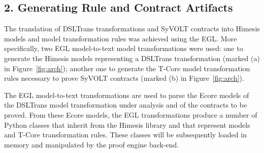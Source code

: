 \subsection*{2. Generating Rule and Contract Artifacts}
\label{sec:gen_models_mt}

The translation of DSLTrans transformations and SyVOLT contracts into Himesis
models and model transformation rules was achieved using the EGL. More specifically, two EGL model-to-text model
transformations were used: one to generate the Himesis models
representing a DSLTrans transformation (marked (a) in Figure~\ref{fig:arch});
another one to generate the T-Core model transformation rules necessary to prove
SyVOLT contracts (marked (b) in Figure~\ref{fig:arch}).

The EGL model-to-text transformations are used to parse the Ecore models of the
DSLTrans model transformation under analysis and of the contracts to be proved.
From these Ecore models, the EGL transformations produce a number of Python
classes that inherit from the Himesis library and that
represent models and T-Core transformation rules. These classes will be
subsequently loaded in memory and manipulated by the proof engine back-end.


